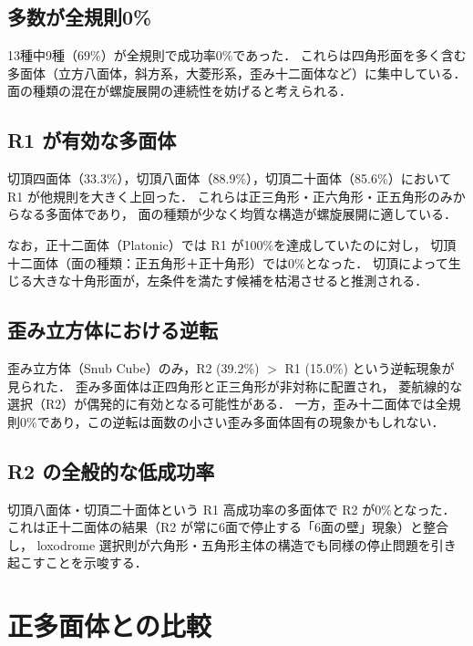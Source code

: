 \documentclass[a4paper,11pt]{article}
\begin{document}
\subsection{多数が全規則0\%}

13種中9種（69\%）が全規則で成功率0\%であった．
これらは四角形面を多く含む多面体（立方八面体，斜方系，大菱形系，歪み十二面体など）に集中している．
面の種類の混在が螺旋展開の連続性を妨げると考えられる．

\subsection{R1 が有効な多面体}

切頂四面体（33.3\%），切頂八面体（88.9\%），切頂二十面体（85.6\%）において R1 が他規則を大きく上回った．
これらは正三角形・正六角形・正五角形のみからなる多面体であり，
面の種類が少なく均質な構造が螺旋展開に適している．

なお，正十二面体（Platonic）では R1 が100\%を達成していたのに対し，
切頂十二面体（面の種類：正五角形＋正十角形）では0\%となった．
切頂によって生じる大きな十角形面が，左条件を満たす候補を枯渇させると推測される．

\subsection{歪み立方体における逆転}

歪み立方体（Snub Cube）のみ，R2 (39.2\%) $>$ R1 (15.0\%) という逆転現象が見られた．
歪み多面体は正四角形と正三角形が非対称に配置され，
菱航線的な選択（R2）が偶発的に有効となる可能性がある．
一方，歪み十二面体では全規則0\%であり，この逆転は面数の小さい歪み多面体固有の現象かもしれない．

\subsection{R2 の全般的な低成功率}

切頂八面体・切頂二十面体という R1 高成功率の多面体で R2 が0\%となった．
これは正十二面体の結果（R2 が常に6面で停止する「6面の壁」現象）と整合し，
loxodrome 選択則が六角形・五角形主体の構造でも同様の停止問題を引き起こすことを示唆する．

\section{正多面体との比較}
\end{document}
